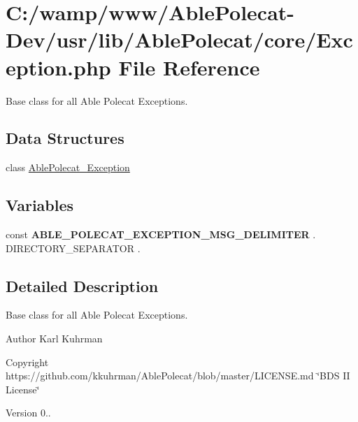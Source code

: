 \hypertarget{_exception_8php}{}\section{C\+:/wamp/www/\+Able\+Polecat-\/\+Dev/usr/lib/\+Able\+Polecat/core/\+Exception.php File Reference}
\label{_exception_8php}


Base class for all Able Polecat Exceptions.  


\subsection*{Data Structures}
\begin{DoxyCompactItemize}
\item 
class \hyperlink{class_able_polecat___exception}{Able\+Polecat\+\_\+\+Exception}
\end{DoxyCompactItemize}
\subsection*{Variables}
\begin{DoxyCompactItemize}
\item 
\hypertarget{_exception_8php_a010f2755c1b110d1b5e27f2852f43516}{}const {\bfseries A\+B\+L\+E\+\_\+\+P\+O\+L\+E\+C\+A\+T\+\_\+\+E\+X\+C\+E\+P\+T\+I\+O\+N\+\_\+\+M\+S\+G\+\_\+\+D\+E\+L\+I\+M\+I\+T\+E\+R} \textquotesingle{} \textquotesingle{} . D\+I\+R\+E\+C\+T\+O\+R\+Y\+\_\+\+S\+E\+P\+A\+R\+A\+T\+O\+R . \textquotesingle{} \textquotesingle{}\label{_exception_8php_a010f2755c1b110d1b5e27f2852f43516}

\end{DoxyCompactItemize}


\subsection{Detailed Description}
Base class for all Able Polecat Exceptions. 

\begin{DoxyAuthor}{Author}
Karl Kuhrman 
\end{DoxyAuthor}
\begin{DoxyCopyright}{Copyright}
https\+://github.com/kkuhrman/\+Able\+Polecat/blob/master/\+L\+I\+C\+E\+N\+S\+E.\+md \char`\"{}\+B\+D\+S I\+I License\char`\"{} 
\end{DoxyCopyright}
\begin{DoxyVersion}{Version}
0.. 
\end{DoxyVersion}
